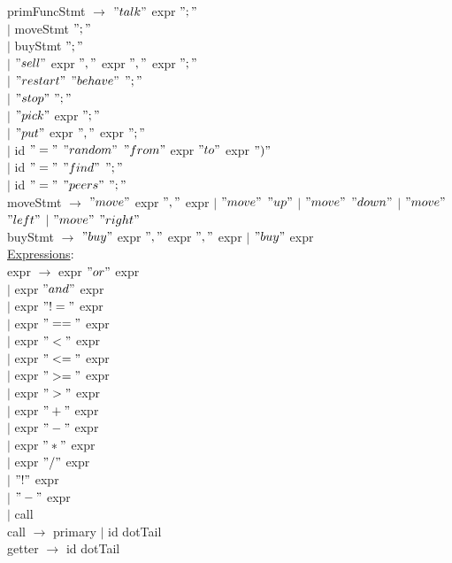 \documentclass{article}
\begin{document}
primFuncStmt 
$\rightarrow$ $"talk"$ expr $";"$ \\ 
$\vert$  moveStmt $";"$ \\
$\vert$ buyStmt $";"$ \\
$\vert$ $"sell"$ expr $","$ expr $","$ expr $";"$ \\
$\vert$ $"restart"$ $"behave"$ $";"$ \\
$\vert$ $"stop"$ $";"$ \\
$\vert$ $"pick"$ expr $";"$ \\
$\vert$ $"put"$ expr $","$ expr $";"$ \\
$\vert$ id $"="$ $"random"$ $"from"$ expr $"to"$ expr $")"$ \\
$\vert$ id $"="$ $"find"$ $";"$ \\
$\vert$ id $"="$ $"peers"$ $";"$\\

moveStmt $\rightarrow$ $"move"$ expr $","$ expr $\vert$ $"move"$ $"up"$ $\vert$ $"move"$ $"down"$ $\vert$ $"move"$ $"left"$ $\vert$ $"move"$ $"right"$ \\

buyStmt $\rightarrow$ $"buy"$ expr $","$ expr $","$ expr $\vert$ $"buy"$  expr\\

\underline{Expressions}: \\

expr $\rightarrow$ expr $"or"$ expr \\
$\vert$ expr $"and"$ expr \\
$\vert$ expr $"!="$ expr \\
$\vert$ expr $"=="$ expr \\
$\vert$ expr $"<"$ expr \\
$\vert$ expr $"<="$ expr \\
$\vert$ expr $">="$ expr \\
$\vert$ expr $">"$ expr \\
$\vert$ expr $"+"$ expr \\
$\vert$ expr $"-"$ expr \\
$\vert$ expr $"*"$ expr \\
$\vert$ expr $"/"$ expr \\
$\vert$ $"!"$ expr \\
$\vert$ $"-"$ expr \\
$\vert$ call \\

call $\rightarrow$ primary $\vert$ id dotTail \\

getter $\rightarrow$ id dotTail \\
\end{document}
